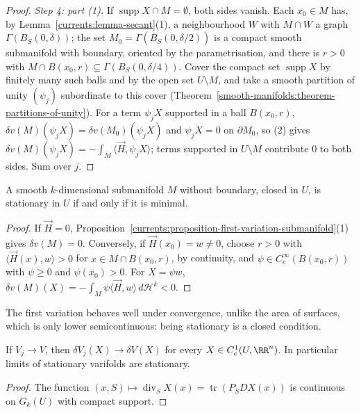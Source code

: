 \begin{proof}
\emph{Step 4: part (1).} If $\operatorname{supp}X \cap M = \emptyset$, both sides vanish. Each $x_0 \in M$ has, by Lemma~\ref{currents:lemma-secant}(1), a neighbourhood $W$ with $M \cap W$ a graph
$\Gamma(B_S(0, \delta))$; the set $M_0 = \Gamma(\overline{B}_S(0, \delta/2))$ is a compact smooth submanifold with boundary, oriented by the parametrisation, and there is $r > 0$ with
$M \cap B(x_0, r) \subseteq \Gamma(B_S(0, \delta/4))$. Cover the compact set $\operatorname{supp}X$ by finitely many such balls and by the open set $U \setminus M$, and take a smooth partition of unity
$(\psi_j)$ subordinate to this cover (Theorem~\ref{smooth-manifolds:theorem-partitions-of-unity}). For a term $\psi_jX$ supported in a ball $B(x_0, r)$, $\delta v(M)(\psi_jX) = \delta v(M_0)(\psi_jX)$ and
$\psi_jX = 0$ on $\partial M_0$, so (2) gives $\delta v(M)(\psi_jX) = -\int_M\langle\vec{H}, \psi_jX\rangle$; terms supported in $U \setminus M$ contribute $0$ to both sides. Sum over $j$.
\end{proof}

\begin{corollary}\label{currents:corollary-stationary-minimal}
A smooth $k$-dimensional submanifold $M$ without boundary, closed in $U$, is stationary in $U$ if and only if it is minimal.
\end{corollary}

\begin{proof}
If $\vec{H} = 0$, Proposition~\ref{currents:proposition-first-variation-submanifold}(1) gives $\delta v(M) = 0$. Conversely, if $\vec{H}(x_0) = w \neq 0$, choose $r > 0$ with $\langle\vec{H}(x), w\rangle > 0$ for
$x \in M \cap B(x_0, r)$, by continuity, and $\psi \in C^\infty_c(B(x_0, r))$ with $\psi \geq 0$ and $\psi(x_0) > 0$. For $X = \psi w$, $\delta v(M)(X) = -\int_M\psi\langle\vec{H}, w\rangle\,d\mathcal{H}^k < 0$.
\end{proof}

The first variation behaves well under convergence, unlike the area of surfaces, which is only lower semicontinuous: being stationary is a closed condition.

\begin{proposition}\label{currents:proposition-first-variation-continuous}
If $V_j \to V$, then $\delta V_j(X) \to \delta V(X)$ for every $X \in C^1_c(U, \RR^n)$. In particular limits of stationary varifolds are stationary.
\end{proposition}

\begin{proof}
The function $(x, S) \mapsto \operatorname{div}_SX(x) = \operatorname{tr}(P_SDX(x))$ is continuous on $G_k(U)$ with compact support.
\end{proof}


